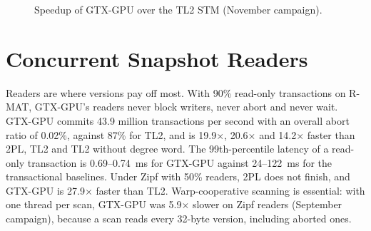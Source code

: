 \documentclass[11pt,a4paper,oneside]{report}
\newcommand{\sys}{GTX-GPU}
\begin{document}
\begin{figure}[H]
\centering
{}
\caption{Speedup of \sys{} over the TL2 STM (November campaign).}
\label{fig:headline}
\end{figure}

\section{Concurrent Snapshot Readers}
\label{sec:readers}
Readers are where versions pay off most. With 90\% read-only transactions on R-MAT, \sys{}'s readers never block
writers, never abort and never wait. \sys{} commits 43.9 million transactions per second with an overall abort ratio
of 0.02\%, against 87\% for TL2, and is 19.9$\times$, 20.6$\times$ and 14.2$\times$ faster than 2PL, TL2 and TL2 without
degree word. The 99th-percentile latency of a read-only transaction is 0.69--0.74~ms for \sys{} against 24--122~ms for
the transactional baselines. Under Zipf with 50\% readers, 2PL does not finish, and \sys{} is 27.9$\times$ faster than
TL2. Warp-cooperative scanning is essential: with one thread per scan, \sys{} was 5.9$\times$ slower on Zipf readers
(September campaign), because a scan reads every 32-byte version, including aborted ones.
\end{document}
